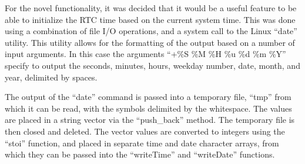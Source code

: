For the novel functionality, it was decided that it would be a useful feature to
be able to initialize the RTC time based on the current system time. This was
done using a combination of file I/O operations, and a system call to the Linux
``date'' utility. This utility allows for the formatting of the output based on
a number of input arguments. In this case the arguments ``+\%S \%M \%H \%u \%d \%m
\%Y'' specify to output the seconds, minutes, hours, weekday number, date, month,
and year, delimited by spaces.

The output of the ``date'' command is passed into a temporary file, ``tmp'' from
which it can be read, with the symbols delimited by the whitespace. The values
are placed in a string vector via the ``push\_back'' method. The temporary file
is then closed and deleted. The vector values are converted to integers using
the ``stoi'' function, and placed in separate time and date character arrays,
from which they can be passed into the ``writeTime'' and ``writeDate''
functions.


